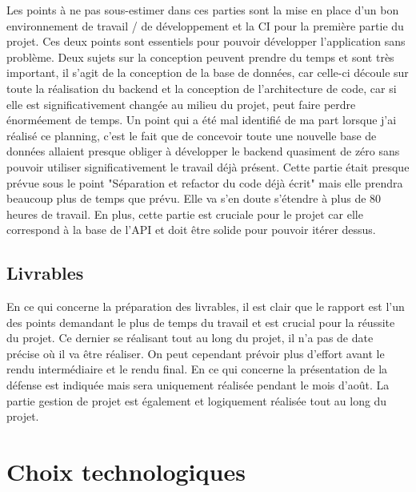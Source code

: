 \documentclass[
    iai, %
    il, %
]{heig-tb}
\begin{document}
Les points à ne pas sous-estimer dans ces parties sont la mise en place d'un bon environnement de travail / de développement et la CI pour la première partie du projet. Ces deux points sont essentiels pour pouvoir développer l'application sans problème.\newline
Deux sujets sur la conception peuvent prendre du temps et sont très important, il s'agit de la conception de la base de données, car celle-ci découle sur toute la réalisation du backend et la conception de l'architecture de code, car si elle est significativement changée au milieu du projet, peut faire perdre énorméement de temps.\newline
Un point qui a été mal identifié de ma part lorsque j'ai réalisé ce planning, c'est le fait que de concevoir toute une nouvelle base de données allaient presque obliger à développer le backend quasiment de zéro sans pouvoir utiliser significativement le travail déjà présent.\newline
Cette partie était presque prévue sous le point "Séparation et refactor du code déjà écrit" mais elle prendra beaucoup plus de temps que prévu. Elle va s'en doute s'étendre à plus de 80 heures de travail.\newline
En plus, cette partie est cruciale pour le projet car elle correspond à la base de l'API et doit être solide pour pouvoir itérer dessus.

\subsection{Livrables}
En ce qui concerne la préparation des livrables, il est clair que le rapport est l'un des points demandant le plus de temps du travail et est crucial pour la réussite du projet. Ce dernier se réalisant tout au long du projet, il n'a pas de date précise où il va être réaliser. On peut cependant prévoir plus d'effort avant le rendu intermédiaire et le rendu final.\newline
En ce qui concerne la présentation de la défense est indiquée mais sera uniquement réalisée pendant le mois d'août.\newline
La partie gestion de projet est également et logiquement réalisée tout au long du projet.



\section{Choix technologiques}
\end{document}
